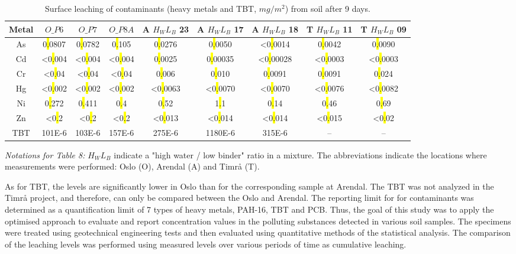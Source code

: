 \documentclass[algorithms,article,submit,pdftex,moreauthors]{Definitions/mdpi}
\begin{document}
\begin{table}[H] 
\begin{threeparttable}
\centering
\caption{Surface leaching of contaminants (heavy metals and TBT, $mg/m^2$) from soil after 9 days.\label{tab07}}
\small
\setlength\tabcolsep{0pt}
\begin{tabularx}{\textwidth}{@{\extracolsep{\fill}} ccccccccc }
\toprule
\textbf{Metal} & \textbf{$O\_P6$} & \textbf{$O\_P7$} & \textbf{$O\_P8A$} & \textbf{A $H_WL_B$ 23} & \textbf{A $H_WL_B$ 17} & \textbf{A $H_WL_B$ 18} & \textbf{T $H_WL_B$ 11} & \textbf{T $H_WL_B$ 09}\\
\midrule
As &  0\hl{.}0807 & 0\hl{.}0782 & 0\hl{.}105 & 0\hl{.}0276 & 0\hl{.}0050 & <0\hl{.}0014 & 0\hl{.}0042 & 0\hl{.}0090 \\
Cd & <0\hl{.}004 & <0\hl{.}004 & <0\hl{.}004 & 0\hl{.}0025 & 0\hl{.}00035 & <0\hl{.}00028 & <0\hl{.}0003 & <0\hl{.}0003 \\
Cr & <0\hl{.}04 & <0\hl{.}04 & <0\hl{.}04 & 0\hl{.}006 & 0\hl{.}010 & 0\hl{.}0091 & 0\hl{.}0091 & 0\hl{.}024 \\
Hg & <0\hl{.}002 & <0\hl{.}002 & <0\hl{.}002 & <0\hl{.}0063 & <0\hl{.}0070 & <0\hl{.}0070 & <0\hl{.}0076 & <0\hl{.}0082 \\
Ni & 0\hl{.}272 & 0\hl{.}411 & 0\hl{.}4 & 0\hl{.}52 & 1\hl{.}1 & 0\hl{.}14 & 0\hl{.}46 & 0\hl{.}69 \\
Zn & <0\hl{.}2 & <0\hl{.}2 & <0\hl{.}2 & <0\hl{.}013 & <0\hl{.}014 & <0\hl{.}014 & <0\hl{.}015 & <0\hl{.}02 \\
TBT & 101E-6 & 103E-6 & 157E-6 & 275E-6 & 1180E-6 & 315E-6 & -- & -- \\
\bottomrule
\end{tabularx}
\begin{tablenotes}
      \small
      	\item \emph{Notations for Table 8:}  $H_WL_B$ indicate a "high water / low binder" ratio in a mixture. The abbreviations indicate the locations where measurements were performed: Oslo (O), Arendal (A) and Timrå (T). 
    \end{tablenotes}
  \end{threeparttable}
\end{table}

As for TBT, the levels are significantly lower in Oslo than for the corresponding sample at Arendal. The TBT was not analyzed in the Timrå project, and therefore, can only be compared between the Oslo and Arendal. The reporting limit for for contaminants was determined as a quantification limit of 7 types of heavy metals, PAH-16, TBT and PCB. Thus, the goal of this study was to apply the optimised approach to evaluate and report concentration values in the polluting substances detected in various soil samples. The specimens were treated using geotechnical engineering tests and then evaluated using quantitative methods of the statistical analysis. The comparison of the leaching levels was performed using measured levels over various periods of time as cumulative leaching.
\end{document}
